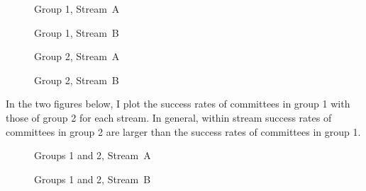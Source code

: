 \documentclass[11pt,reqno]{amsart}
\theoremstyle{definition}
\begin{document}
\begin{figure}
\centering

\caption{\footnotesize Group 1, Stream~A}
\label{fig:sshrc_rates_common_A}
\end{figure}

\begin{figure}
\centering

\caption{\footnotesize Group 1, Stream~B}
\label{fig:sshrc_rates_common_B}
\end{figure}


\begin{figure}
\centering

\caption{\footnotesize Group 2, Stream~A}
\label{fig:sshrc_rates_above_A}
\end{figure}

\begin{figure}
\centering

\caption{\footnotesize Group 2, Stream~B}
\label{fig:sshrc_rates_above_B}
\end{figure}

\noindent In the two figures below, I plot the success rates of committees in group 1 with those of group 2 for each stream. In general, within stream success rates of committees in group 2 are larger than the success rates of committees in group 1. 

\begin{figure}
\centering

\caption{\footnotesize Groups 1 and 2, Stream~A}
\label{fig:sshrc_rates_both_A}
\end{figure}

\begin{figure}
\centering

\caption{\footnotesize Groups 1 and 2, Stream~B}
\label{fig:sshrc_rates_both_B}
\end{figure}

\noindent 


% 
\end{document}
